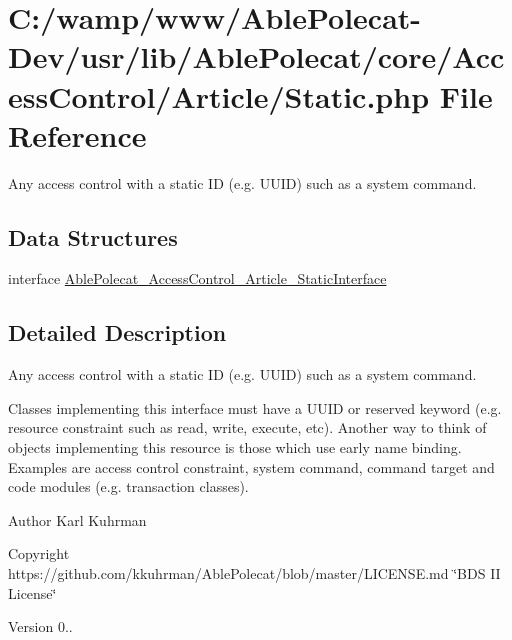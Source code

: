 \hypertarget{_static_8php}{}\section{C\+:/wamp/www/\+Able\+Polecat-\/\+Dev/usr/lib/\+Able\+Polecat/core/\+Access\+Control/\+Article/\+Static.php File Reference}
\label{_static_8php}


Any access control with a static I\+D (e.\+g. U\+U\+I\+D) such as a system command.  


\subsection*{Data Structures}
\begin{DoxyCompactItemize}
\item 
interface \hyperlink{interface_able_polecat___access_control___article___static_interface}{Able\+Polecat\+\_\+\+Access\+Control\+\_\+\+Article\+\_\+\+Static\+Interface}
\end{DoxyCompactItemize}


\subsection{Detailed Description}
Any access control with a static I\+D (e.\+g. U\+U\+I\+D) such as a system command. 

Classes implementing this interface must have a U\+U\+I\+D or reserved keyword (e.\+g. resource constraint such as read, write, execute, etc). Another way to think of objects implementing this resource is those which use early name binding. Examples are access control constraint, system command, command target and code modules (e.\+g. transaction classes).

\begin{DoxyAuthor}{Author}
Karl Kuhrman 
\end{DoxyAuthor}
\begin{DoxyCopyright}{Copyright}
https\+://github.com/kkuhrman/\+Able\+Polecat/blob/master/\+L\+I\+C\+E\+N\+S\+E.\+md \char`\"{}\+B\+D\+S I\+I License\char`\"{} 
\end{DoxyCopyright}
\begin{DoxyVersion}{Version}
0.. 
\end{DoxyVersion}
